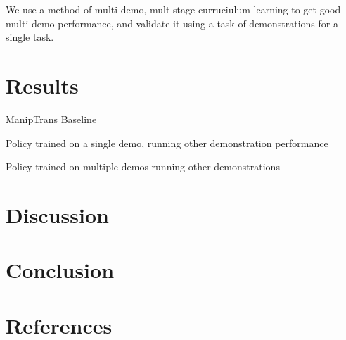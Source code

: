 \documentclass[11pt,a4paper]{article}
\begin{document}
We use a method of multi-demo, mult-stage curruciulum learning to get good multi-demo performance, and validate it using a task of demonstrations for a single task. 

\section{Results}

ManipTrans Baseline

Policy trained on a single demo, running other demonstration performance

Policy trained on multiple demos running other demonstrations

\section{Discussion}

\section{Conclusion}

\newpage
\section{References}
\printbibliography[heading=none]
\newpage

\end{document}
